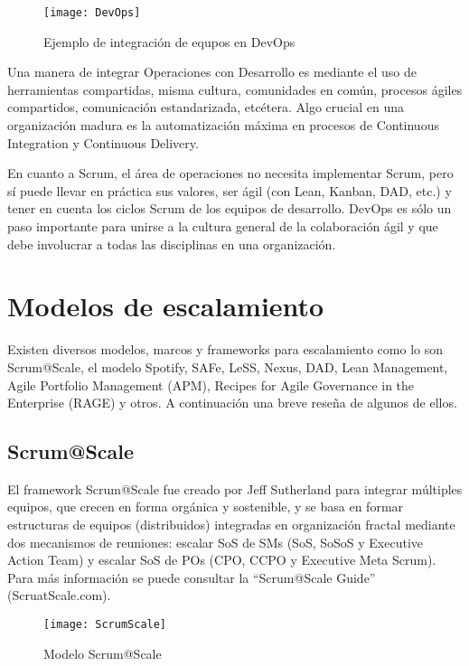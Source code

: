 \begin{figure}[h]
  \centering
  \texttt{[image: DevOps]}
  \caption{Ejemplo de integración de equpos en DevOps}
  \centering
  \label{fig:DevOps} %
\end{figure}

Una manera de integrar Operaciones con Desarrollo es mediante el uso de herramientas compartidas, misma cultura, comunidades en común, procesos ágiles compartidos, comunicación estandarizada, etcétera. Algo crucial en una organización madura es la automatización máxima en procesos de Continuous Integration y Continuous Delivery.

En cuanto a Scrum, el área de operaciones no necesita implementar Scrum, pero sí puede llevar en práctica sus valores, ser ágil (con Lean, Kanban, DAD, etc.) y tener en cuenta los ciclos Scrum de los equipos de desarrollo. DevOps es sólo un paso importante para unirse a la cultura general de la colaboración ágil y que debe involucrar a todas las disciplinas en una organización. 


\section{Modelos de escalamiento}

Existen diversos modelos, marcos y frameworks para escalamiento como lo son Scrum@Scale, el modelo Spotify, SAFe, LeSS, Nexus, DAD, Lean Management, Agile Portfolio Management (APM), Recipes for Agile Governance in the Enterprise (RAGE) y otros. A continuación una breve reseña de algunos de ellos.

\subsection{Scrum@Scale}
El framework Scrum@Scale fue creado por Jeff Sutherland para integrar múltiples equipos, que crecen en forma orgánica y sostenible, y se basa en formar estructuras de equipos (distribuidos) integradas en organización fractal mediante dos mecanismos de reuniones: escalar SoS de SMs (SoS, SoSoS y Executive Action Team) y escalar SoS de POs (CPO, CCPO y Executive Meta Scrum). Para más información se puede consultar la “Scrum@Scale Guide” (ScruatScale.com).

\begin{figure}[h]
  \centering
  \texttt{[image: ScrumScale]}
  \caption{Modelo Scrum@Scale}
  \centering
  \label{fig:ScrumScale} %
\end{figure}

